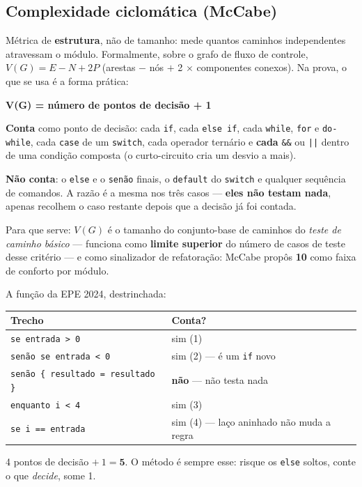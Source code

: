 \subsection{Complexidade ciclomática (McCabe)}

\begin{conceito}
Métrica de \textbf{estrutura}, não de tamanho: mede quantos caminhos
independentes atravessam o módulo. Formalmente, sobre o grafo de fluxo de
controle, $V(G) = E - N + 2P$ (arestas $-$ nós $+$ 2 $\times$ componentes
conexos). Na prova, o que se usa é a forma prática:

\begin{center}
\textbf{V(G) = número de pontos de decisão + 1}
\end{center}

\textbf{Conta} como ponto de decisão: cada \texttt{if}, cada \texttt{else if},
cada \texttt{while}, \texttt{for} e \texttt{do-while}, cada \texttt{case} de
um \texttt{switch}, cada operador ternário e \textbf{cada} \texttt{\&\&} ou
\texttt{||} dentro de uma condição composta (o curto-circuito cria um desvio
a mais).

\textbf{Não conta}: o \texttt{else} e o \texttt{senão} finais, o
\texttt{default} do \texttt{switch} e qualquer sequência de comandos. A razão
é a mesma nos três casos --- \textbf{eles não testam nada}, apenas recolhem o
caso restante depois que a decisão já foi contada.

Para que serve: $V(G)$ é o tamanho do conjunto-base de caminhos do
\emph{teste de caminho básico} --- funciona como \textbf{limite superior} do
número de casos de teste desse critério --- e como sinalizador de
refatoração: McCabe propôs \textbf{10} como faixa de conforto por módulo.
\end{conceito}

\begin{comosair}
A função da EPE 2024, destrinchada:

\begin{center}
\begin{tabular}{@{}p{6.4cm}p{5.6cm}@{}}
\toprule
\textbf{Trecho} & \textbf{Conta?} \\
\midrule
\texttt{se entrada > 0} & sim (1) \\
\texttt{senão se entrada < 0} & sim (2) --- é um \texttt{if} novo \\
\texttt{senão \{ resultado = resultado \}} & \textbf{não} --- não testa nada \\
\texttt{enquanto i < 4} & sim (3) \\
\texttt{se i == entrada} & sim (4) --- laço aninhado não muda a regra \\
\bottomrule
\end{tabular}
\end{center}

4 pontos de decisão $+\ 1 = \mathbf{5}$. O método é sempre esse: risque os
\texttt{else} soltos, conte o que \emph{decide}, some 1.
\end{comosair}

